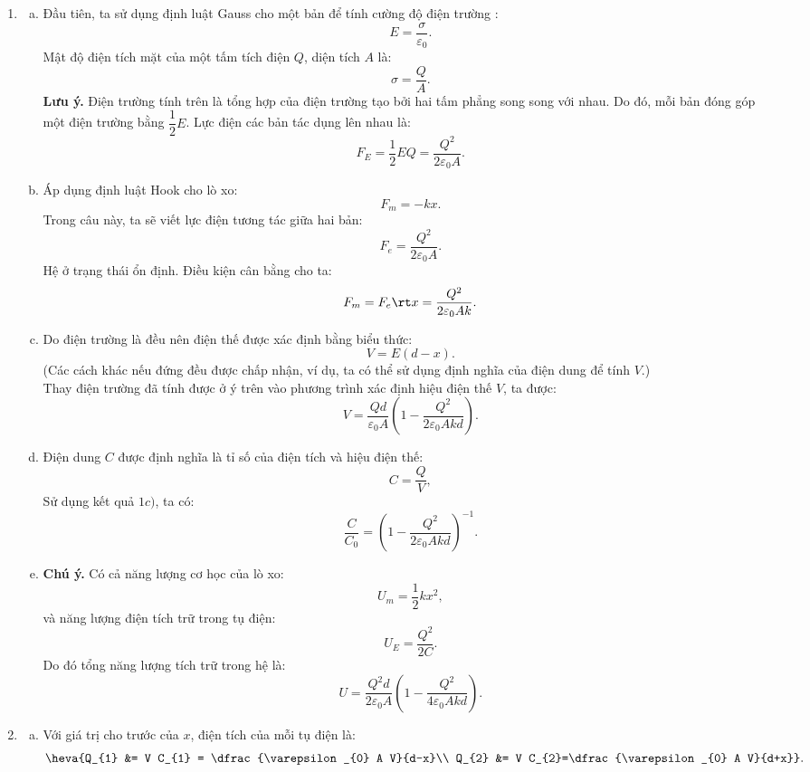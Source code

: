 \begin{loigiai}\[\]
\begin{enumerate}[1)]
    \item 
    \begin{enumerate}[a)]
    \item Đầu tiên, ta sử dụng định luật Gauss cho một bản để tính cường độ điện trường :
    \[E=\dfrac{\sigma}{\varepsilon_{0}}.\]
    Mật độ điện tích mặt của một tấm tích điện $Q$, diện tích $A$ là:
    \[\sigma=\dfrac{Q}{A}.\]
    \textbf{Lưu ý.} Điện trường tính trên là tổng hợp của điện trường tạo bởi hai tấm phẳng song song với nhau. Do đó, mỗi bản đóng góp một điện trường bằng $\dfrac{1}{2}E$. Lực điện các bản tác dụng lên nhau là:
    \[F_E = \dfrac{1}{2} E Q = \dfrac{Q^{2}}{2 \varepsilon_{0} A}.\]
    \item Áp dụng định luật Hook cho lò xo:
    \[F_{m} = -k x.\]
    Trong câu này, ta sẽ viết lực điện tương tác giữa hai bản:
    \[F_e = \dfrac{Q^{2}}{2 \varepsilon_{0} A}.\]
    Hệ ở trạng thái ổn định. Điều kiện cân bằng cho ta:
    \[F_{m}=F_{e} \rt x = \dfrac{Q^{2}}{2 \varepsilon_{0} A k}.\]
    \item Do điện trường là đều nên điện thế được xác định bằng biểu thức:
    \[V = E(d-x).\]
    (Các cách khác nếu đứng đều được chấp nhận, ví dụ, ta có thể sử dụng định nghĩa của điện dung để tính $V$.)\\
    Thay điện trường đã tính được ở ý trên vào phương trình xác định hiệu điện thế $V$, ta được:
    \[V=\dfrac{Q d}{\varepsilon_{0} A}\left(1-\dfrac{Q^{2}}{2 \varepsilon_{0} A k d}\right).\]
    \item Điện dung $C$ được định nghĩa là tỉ số của điện tích và hiệu điện thế:
    \[C = \dfrac{Q}{V},\]
    Sử dụng kết quả $1c)$, ta có:
    \[\dfrac{C}{C_{0}} = \left(1-\dfrac{Q^{2}}{2 \varepsilon_{0} A k d}\right)^{-1}.\]
    \item \textbf{Chú ý.} Có cả năng lượng cơ học của lò xo:
    \[U_{m}=\dfrac{1}{2} k x^{2},\]
    và năng lượng điện tích trữ trong tụ điện:
    \[U_{E}=\dfrac{Q^{2}}{2 C}.\]
    Do đó tổng năng lượng tích trữ trong hệ là:
    \[U = \dfrac{Q^{2} d}{2 \varepsilon_{0} A}\left(1-\dfrac{Q^{2}}{4 \varepsilon_{0} A k d}\right).\]
    \end{enumerate}
    \item 
    \begin{enumerate}[a)]
        \item Với giá trị cho trước của $x$, điện tích của mỗi tụ điện là:
        \[\heva{Q_{1} &= V C_{1} = \dfrac{\varepsilon_{0} A V}{d-x}\\ Q_{2} &= V C_{2}=\dfrac{\varepsilon_{0} A V}{d+x}}.\]

\end{enumerate}
\end{enumerate}
\end{loigiai}
